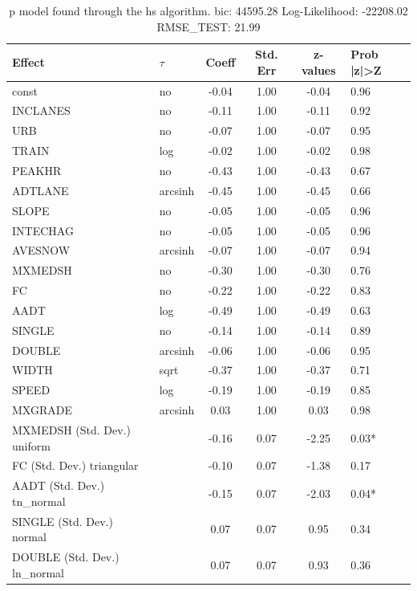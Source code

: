 \begin{table}
	\caption{p model found through the hs algorithm. bic: 44595.28 Log-Likelihood: -22208.02 RMSE_TEST: 21.99}
	\begin{center}
		\begin{tabular}{|l|l|c|c|c|l|}
			\hline
			Effect & $\tau$ & Coeff & Std. Err & z-values & Prob |z|>Z \\
			\hline
			const & no & -0.04 & 1.00 & -0.04 & 0.96 \\
			\hline
			INCLANES & no & -0.11 & 1.00 & -0.11 & 0.92 \\
			\hline
			URB & no & -0.07 & 1.00 & -0.07 & 0.95 \\
			\hline
			TRAIN & log & -0.02 & 1.00 & -0.02 & 0.98 \\
			\hline
			PEAKHR & no & -0.43 & 1.00 & -0.43 & 0.67 \\
			\hline
			ADTLANE & arcsinh & -0.45 & 1.00 & -0.45 & 0.66 \\
			\hline
			SLOPE & no & -0.05 & 1.00 & -0.05 & 0.96 \\
			\hline
			INTECHAG & no & -0.05 & 1.00 & -0.05 & 0.96 \\
			\hline
			AVESNOW & arcsinh & -0.07 & 1.00 & -0.07 & 0.94 \\
			\hline
			MXMEDSH & no & -0.30 & 1.00 & -0.30 & 0.76 \\
			\hline
			FC & no & -0.22 & 1.00 & -0.22 & 0.83 \\
			\hline
			AADT & log & -0.49 & 1.00 & -0.49 & 0.63 \\
			\hline
			SINGLE & no & -0.14 & 1.00 & -0.14 & 0.89 \\
			\hline
			DOUBLE & arcsinh & -0.06 & 1.00 & -0.06 & 0.95 \\
			\hline
			WIDTH & sqrt & -0.37 & 1.00 & -0.37 & 0.71 \\
			\hline
			SPEED & log & -0.19 & 1.00 & -0.19 & 0.85 \\
			\hline
			MXGRADE & arcsinh & 0.03 & 1.00 & 0.03 & 0.98 \\
			\hline
			MXMEDSH (Std. Dev.) uniform &  & -0.16 & 0.07 & -2.25 & 0.03* \\
			\hline
			FC (Std. Dev.) triangular &  & -0.10 & 0.07 & -1.38 & 0.17 \\
			\hline
			AADT (Std. Dev.) tn_normal &  & -0.15 & 0.07 & -2.03 & 0.04* \\
			\hline
			SINGLE (Std. Dev.) normal &  & 0.07 & 0.07 & 0.95 & 0.34 \\
			\hline
			DOUBLE (Std. Dev.) ln_normal &  & 0.07 & 0.07 & 0.93 & 0.36 \\

\end{tabular}
\end{center}
\end{table}
